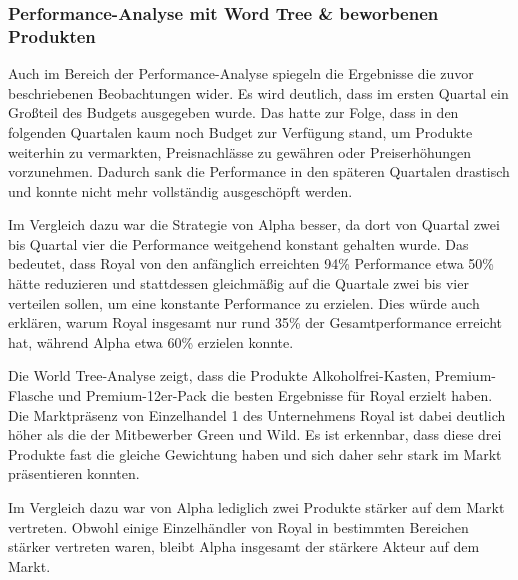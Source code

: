 \documentclass[a4paper,12pt]{article}
\begin{document}
\subsubsection{Performance-Analyse mit Word Tree \& beworbenen Produkten}
Auch im Bereich der Performance-Analyse spiegeln die Ergebnisse die zuvor beschriebenen Beobachtungen wider.
Es wird deutlich, dass im ersten Quartal ein Großteil des Budgets ausgegeben wurde.
Das hatte zur Folge, dass in den folgenden Quartalen kaum noch Budget zur Verfügung stand,
um Produkte weiterhin zu vermarkten, Preisnachlässe zu gewähren oder Preiserhöhungen vorzunehmen.
Dadurch sank die Performance in den späteren Quartalen drastisch und konnte nicht mehr vollständig ausgeschöpft werden.

Im Vergleich dazu war die Strategie von Alpha besser,
da dort von Quartal zwei bis Quartal vier die Performance weitgehend konstant gehalten wurde.
Das bedeutet, dass Royal von den anfänglich erreichten 94\% Performance etwa 50\% hätte reduzieren und stattdessen gleichmäßig
auf die Quartale zwei bis vier verteilen sollen, um eine konstante Performance zu erzielen.
Dies würde auch erklären, warum Royal insgesamt nur rund 35\% der Gesamtperformance erreicht hat,
während Alpha etwa 60\% erzielen konnte.


Die World Tree-Analyse zeigt, dass die Produkte Alkoholfrei-Kasten,
Premium-Flasche und Premium-12er-Pack die besten Ergebnisse für Royal erzielt haben.
Die Marktpräsenz von Einzelhandel 1 des Unternehmens Royal ist dabei deutlich höher als die der
Mitbewerber Green und Wild. Es ist erkennbar,
dass diese drei Produkte fast die gleiche Gewichtung haben und sich daher sehr
stark im Markt präsentieren konnten.

Im Vergleich dazu war von Alpha lediglich zwei Produkte stärker auf dem Markt vertreten.
Obwohl einige Einzelhändler von Royal in bestimmten Bereichen stärker vertreten waren,
bleibt Alpha insgesamt der stärkere Akteur auf dem Markt.
\end{document}
